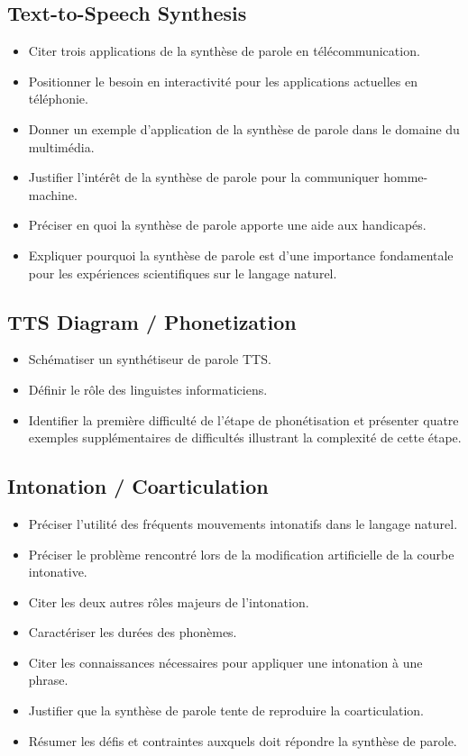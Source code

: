 \documentclass[letterpaper, 12pt]{article}
\begin{document}
	\subsection{Text-to-Speech Synthesis}
		\begin{itemize}
			\setlength{\itemsep}{0pt}		
			\setlength{\parskip}{0pt}		
			\setlength{\parsep}{0pt}	
			\item Citer trois applications de la synthèse de parole en télécommunication.
		    \item Positionner le besoin en interactivité pour les applications actuelles en téléphonie.
		    \item Donner un exemple d'application de la synthèse de parole dans le domaine du multimédia.
		    \item Justifier l'intérêt de la synthèse de parole pour la communiquer homme-machine.
		    \item Préciser en quoi la synthèse de parole apporte une aide aux handicapés.
		    \item Expliquer pourquoi la synthèse de parole est d'une importance fondamentale pour les 
		    	expériences scientifiques sur le langage naturel.
		\end{itemize}
	\subsection{TTS Diagram / Phonetization}
		\begin{itemize}
			\setlength{\itemsep}{0pt}		
			\setlength{\parskip}{0pt}		
			\setlength{\parsep}{0pt}	
			\item Schématiser un synthétiseur de parole TTS.
		    \item Définir le rôle des linguistes informaticiens.
		    \item Identifier la première difficulté de l'étape de phonétisation et présenter quatre 
		    	exemples supplémentaires de difficultés illustrant la complexité de cette étape.
		\end{itemize}
	\subsection{Intonation / Coarticulation}
		\begin{itemize}
			\setlength{\itemsep}{0pt}		
			\setlength{\parskip}{0pt}		
			\setlength{\parsep}{0pt}	
			\item Préciser l'utilité des fréquents mouvements intonatifs dans le langage naturel.
		    \item Préciser le problème rencontré lors de la modification artificielle de la courbe intonative.
		    \item Citer les deux autres rôles majeurs de l'intonation.
		    \item Caractériser les durées des phonèmes.
		    \item Citer les connaissances nécessaires pour appliquer une intonation à une phrase.
		    \item Justifier que la synthèse de parole tente de reproduire la coarticulation.
		    \item Résumer les défis et contraintes auxquels doit répondre la synthèse de parole.
		\end{itemize}
\end{document}

